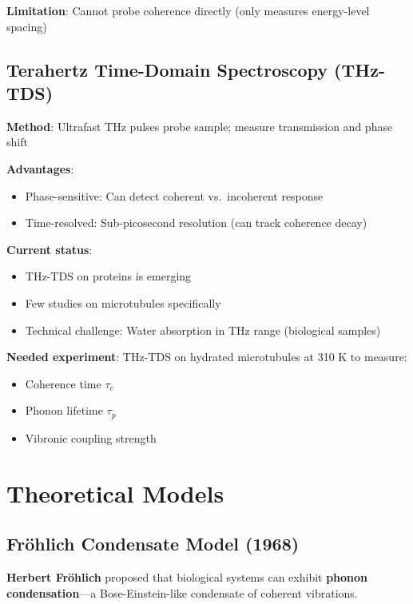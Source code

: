 \textbf{Limitation}: Cannot probe coherence directly (only measures
energy-level spacing)

\subsection{Terahertz Time-Domain Spectroscopy (THz-TDS)}\label{terahertz-time-domain-spectroscopy-thz-tds-emerging}

\textbf{Method}: Ultrafast THz pulses probe sample; measure transmission and phase shift

\textbf{Advantages}:
\begin{itemize}
\item Phase-sensitive: Can detect coherent vs.~incoherent response
\item Time-resolved: Sub-picosecond resolution (can track coherence decay)
\end{itemize}

\textbf{Current status}:
\begin{itemize}
\item THz-TDS on proteins is emerging
\item Few studies on microtubules specifically
\item Technical challenge: Water absorption in THz range (biological samples)
\end{itemize}

\textbf{Needed experiment}: THz-TDS on hydrated microtubules at 310 K to measure:
\begin{itemize}
\item Coherence time $\tau_c$
\item Phonon lifetime $\tau_p$
\item Vibronic coupling strength
\end{itemize}



\section{Theoretical Models}\label{theoretical-models}

\subsection{Fröhlich Condensate Model (1968)}\label{fruxf6hlich-condensate-model-1968}

\textbf{Herbert Fröhlich} proposed that biological systems can exhibit \textbf{phonon condensation}---a Bose-Einstein-like condensate of coherent vibrations.

